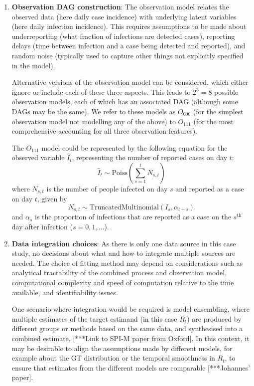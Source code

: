 \documentclass{article}
\begin{document}
\begin{enumerate}
\item \textbf{Observation DAG construction}: The observation model relates the observed data (here daily case incidence) with underlying latent variables (here daily infection incidence). 
This requires assumptions to be made about underreporting (what fraction of infections are detected cases), reporting delays (time between infection and a case being detected and reported), and random noise (typically used to capture other things not explicitly specified in the model).

Alternative versions of the observation model can be considered, which either ignore or include each of these three aspects. This leads to $2^3=8$ possible observation models, each of which has an associated DAG (although some DAGs may be the same).
We refer to these models as $O_{000}$ (for the simplest observation model not modelling any of the above) to $O_{111}$ (for the most comprehensive accounting for all three observation features). 

The $O_{111}$ model could be represented by the following equation for the observed variable $\hat{I}_t$, representing the number of reported cases on day $t$:
\begin{equation}
    \hat{I}_t \sim \mathrm{Poiss}\left( \sum_{s=1}^t N_{s,t}\right)
\end{equation}
where $N_{s,t}$ is the number of people infected on day $s$ and reported as a case on day $t$, given by
\begin{equation}
    N_{s,t} \sim \mathrm{TruncatedMultinomial}\left( I_s, \alpha_{t-s}\right) 
\end{equation}
and $\alpha_s$ is the proportion of infections that are reported as a case on the $s^\mathrm{th}$ day after infection ($s=0,1,\ldots$). 


\item \textbf{Data integration choices}: As there is only one data source in this case study, no decisions about what and how to integrate multiple sources are needed. The choice of fitting method may depend on considerations such as analytical tractability of the combined process and observation model, computational complexity and speed of computation relative to the time available, and identifiability issues. 
 
One scenario where integration would be required is model ensembling, where multiple estimates of the target estimand (in this case $R_t$) are produced by different groups or methods based on the same data, and synthesised into a combined estimate. [***Link to SPI-M paper from Oxford]. In this context, it may be desirable to align the assumptions made by different models, for example about the GT distribution or the temporal smoothness in $R_t$, to ensure that estimates from the different models are  comparable [***Johannes’ paper].


\end{enumerate}
\end{document}
